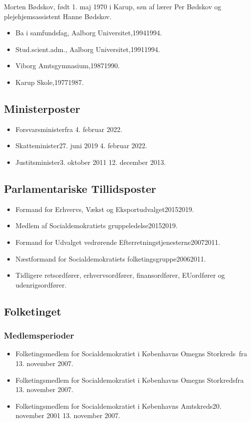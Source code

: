 \documentclass[11pt, a4paper]{awesome-cv}
\begin{document}
\makecvheader[R]
\makelettertitle
\begin{cvletter}
Morten Bødskov, født 1. maj 1970 i Karup, søn af lærer Per Bødskov og plejehjemsassistent Hanne Bødskov.

\begin{itemize}
\item Ba i samfundsfag, Aalborg Universitet,19941994.
\item Stud.scient.adm., Aalborg Universitet,19911994.
\item Viborg Amtsgymnasium,19871990.
\item Karup Skole,19771987.
\end{itemize}
\subsection*{Ministerposter}
\begin{itemize}
\item Forsvarsministerfra 4. februar 2022.
\item Skatteminister27. juni 2019  4. februar 2022.
\item Justitsminister3. oktober 2011  12. december 2013.
\end{itemize}
\subsection*{Parlamentariske Tillidsposter}
\begin{itemize}
\item Formand for Erhvervs, Vækst og Eksportudvalget20152019.
\item Medlem af Socialdemokratiets gruppeledelse20152019.
\item Formand for Udvalget vedrørende Efterretningstjenesterne20072011.
\item Næstformand for Socialdemokratiets folketingsgruppe20062011.
\item Tidligere retsordfører, erhvervsordfører, finansordfører, EUordfører og udenrigsordfører.
\end{itemize}
\subsection*{Folketinget}
\subsubsection*{Medlemsperioder}
\begin{itemize}
\item Folketingsmedlem for Socialdemokratiet i Københavns Omegns Storkreds fra 13. november 2007.
\item Folketingsmedlem for Socialdemokratiet i Københavns Omegns Storkredsfra 13. november 2007.
\item Folketingsmedlem for Socialdemokratiet i Københavns Amtskreds20. november 2001  13. november 2007.
\end{itemize}

\end{cvletter}
\end{document}
